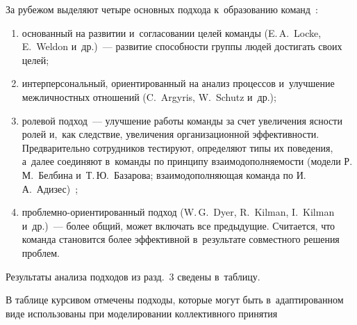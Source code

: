 \begin{multicols}{2}
  За рубежом выделяют четыре основных подхода к~образованию 
команд~\cite{31-r}:
  \begin{enumerate}[(1)]
  \item  основанный на развитии и~согласовании целей команды (E.\,A.~Locke, 
E.~Weldon и~др.)~--- развитие спо\-соб\-ности группы людей достигать своих 
целей;
  \item интерперсональный, ориентированный на анализ процессов 
  и~улучшение межличностных отношений (C.~Argyris, W.~Schutz и~др.); 
  \item ролевой подход~--- улучшение работы команды за счет увеличения 
яс\-ности ролей и,~как следствие, увеличения организационной эф\-фек\-тив\-ности. 
Пред\-ва\-ри\-тел\-ьно сотрудников тес\-ти\-ру\-ют, определяют типы их поведения, 
а~далее со\-еди\-ня\-ют в~команды по принципу взаи\-мо\-до\-пол\-ня\-емости (модели 
Р.\,М.~Белбина и~Т.\,Ю.~Базарова; взаи\-мо\-до\-пол\-ня\-ющая команда по 
И.\,А.~Адизес)~\cite{3-r, 32-r};
  \item проблемно-ори\-ен\-ти\-ро\-ван\-ный подход (W.\,G.~Dyer, R.~Kilman, 
I.~Kilman и~др.)~--- более общий, может вклю\-чать все предыду\-щие. Считается, 
что команда становится более эффективной в~результате совместного решения 
проб\-лем. 
  \end{enumerate}
  
  Результаты анализа подходов из разд.~3 сведены в~таб\-лицу.
  
  
  В таблице курсивом отмечены подходы, которые могут быть 
в~адаптированном виде использованы при моделировании коллективного 
принятия\linebreak\vspace*{-12pt}

\pagebreak

\end{multicols}

